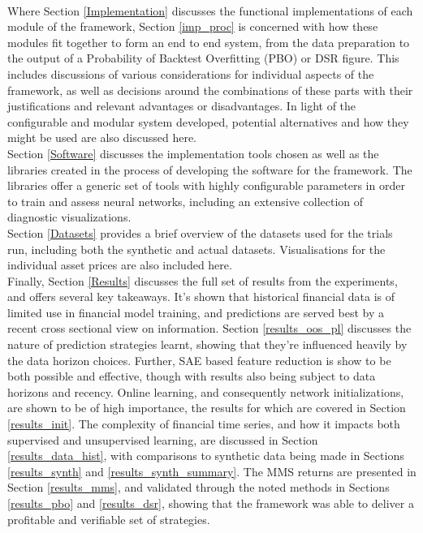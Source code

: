 \documentclass[a4paper,11pt,oneside]{article}
\theoremstyle{plain}
\theoremstyle{definition}
\begin{document}
	~\\\newline
		Where Section \ref{Implementation} discusses the functional implementations of each module of the framework, Section \ref{imp_proc} is concerned with how these modules fit together to form an end to end system, from the data preparation to the output of a Probability of Backtest Overfitting (PBO) or DSR figure. This includes discussions of various considerations for individual aspects of the framework, as well as decisions around the combinations of these parts with their justifications and relevant advantages or disadvantages. In light of the configurable and modular system developed, potential alternatives and how they might be used are also discussed here.
	~\\\newline
		Section \ref{Software} discusses the implementation tools chosen as well as the libraries created in the process of developing the software for the framework. The libraries offer a generic set of tools with highly configurable parameters in order to train and assess neural networks, including an extensive collection of diagnostic visualizations.
	~\\\newline
		Section \ref{Datasets} provides a brief overview of the datasets used for the trials run, including both the synthetic and actual datasets. Visualisations for the individual asset prices are also included here.
	~\\\newline
		Finally, Section \ref{Results} discusses the full set of results from the experiments, and offers several key takeaways. It's shown that historical financial data is of limited use in financial model training, and predictions are served best by a recent cross sectional view on information. Section \ref{results_oos_pl} discusses the nature of prediction strategies learnt, showing that they're influenced heavily by the data horizon choices. Further, SAE based feature reduction is show to be both possible and effective, though with results also being subject to data horizons and recency. Online learning, and consequently network initializations, are shown to be of high importance, the results for which are covered in Section \ref{results_init}. The complexity of financial time series, and how it impacts both supervised and unsupervised learning, are discussed in Section \ref{results_data_hist}, with comparisons to synthetic data being made in Sections \ref{results_synth} and \ref{results_synth_summary}. The MMS returns are presented in Section \ref{results_mms}, and validated through the noted methods in Sections \ref{results_pbo} and \ref{results_dsr}, showing that the framework was able to deliver a profitable and verifiable set of strategies.
	
\end{document}
